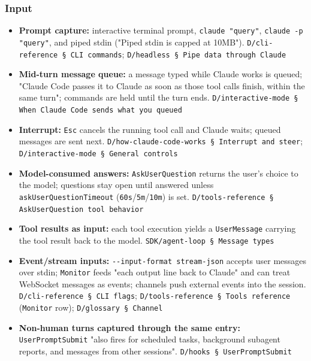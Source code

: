 \subsubsection*{Input}
\begin{itemize}
\item \textbf{Prompt capture:} interactive terminal prompt, \texttt{claude "query"}, \texttt{claude -\allowbreak{}p "query"}, and piped stdin ("Piped stdin is capped at 10MB"). \texttt{D/\allowbreak{}cli-\allowbreak{}reference § CLI commands}; \texttt{D/\allowbreak{}headless § Pipe data through Claude}
\item \textbf{Mid-turn message queue:} a message typed while Claude works is queued; "Claude Code passes it to Claude as soon as those tool calls finish, within the same turn"; commands are held until the turn ends. \texttt{D/\allowbreak{}interactive-\allowbreak{}mode § When Claude Code sends what you queued}
\item \textbf{Interrupt:} \texttt{Esc} cancels the running tool call and Claude waits; queued messages are sent next. \texttt{D/\allowbreak{}how-\allowbreak{}claude-\allowbreak{}code-\allowbreak{}works § Interrupt and steer}; \texttt{D/\allowbreak{}interactive-\allowbreak{}mode § General controls}
\item \textbf{Model-consumed answers:} \texttt{AskUserQuestion} returns the user's choice to the model; questions stay open until answered unless \texttt{askUserQuestionTimeout} (\texttt{60s}/\texttt{5m}/\texttt{10m}) is set. \texttt{D/\allowbreak{}tools-\allowbreak{}reference § AskUserQuestion tool behavior}
\item \textbf{Tool results as input:} each tool execution yields a \texttt{UserMessage} carrying the tool result back to the model. \texttt{SDK/\allowbreak{}agent-\allowbreak{}loop § Message types}
\item \textbf{Event/stream inputs:} \texttt{-\allowbreak{}-\allowbreak{}input-\allowbreak{}format stream-\allowbreak{}json} accepts user messages over stdin; \texttt{Monitor} feeds "each output line back to Claude" and can treat WebSocket messages as events; channels push external events into the session. \texttt{D/\allowbreak{}cli-\allowbreak{}reference § CLI flags}; \texttt{D/\allowbreak{}tools-\allowbreak{}reference § Tools reference} (\texttt{Monitor} row); \texttt{D/\allowbreak{}glossary § Channel}
\item \textbf{Non-human turns captured through the same entry:} \texttt{UserPromptSubmit} "also fires for scheduled tasks, background subagent reports, and messages from other sessions". \texttt{D/\allowbreak{}hooks § UserPromptSubmit}

\end{itemize}
